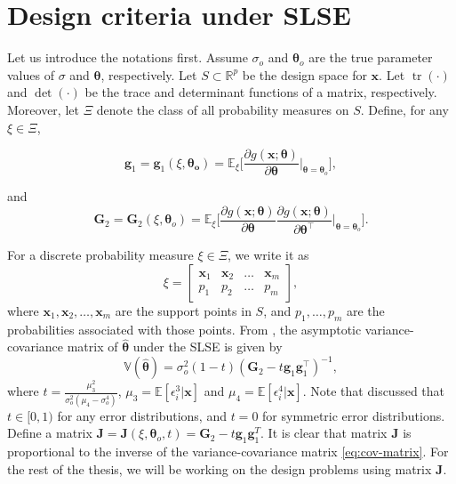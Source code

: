\documentclass[
]{book}
\theoremstyle{definition}
\theoremstyle{definition}
\theoremstyle{definition}
\theoremstyle{definition}
\theoremstyle{remark}
\begin{document}
\section{Design criteria under SLSE}\label{design-criteria-under-slse}

Let us introduce the notations first. Assume \(\sigma_o\) and \(\boldsymbol{\theta}_o\) are the true parameter values of \(\sigma\) and \(\boldsymbol{\theta}\), respectively. Let \(S \subset \mathbb{R}^p\) be the design space for \(\boldsymbol{x}\). Let \(\operatorname{tr}(\cdot)\) and \(\det(\cdot)\) be the trace and determinant functions of a matrix, respectively. Moreover, let \(\Xi\) denote the class of all probability measures on \(S\). Define, for any \(\xi\in \Xi\),

\begin{equation*}
\boldsymbol{g}_1=\boldsymbol{g}_1(\xi,\boldsymbol{\theta_o})=\mathbb{E}_{\xi}\bigg[ \frac{\partial g(\boldsymbol{x};\boldsymbol{\theta})}{\partial \boldsymbol{\theta}}\Big|_{\boldsymbol{\theta}=\boldsymbol{\theta}_o} \bigg],
\end{equation*}

and
\begin{equation*}
\boldsymbol{G}_2=\boldsymbol{G}_2(\xi,\boldsymbol{\theta}_o)=\mathbb{E}_{\xi} \bigg[ \frac{\partial g(\boldsymbol{x};\boldsymbol{\theta})}{\partial \boldsymbol{\theta}}\frac{\partial g(\boldsymbol{x};\boldsymbol{\theta})}{\partial \boldsymbol{\theta}^\top}\Big|_{\boldsymbol{\theta}=\boldsymbol{\theta}_o}\bigg].
\end{equation*}

For a discrete probability measure \(\xi\in \Xi\), we write it as
\[
\xi=\begin{bmatrix}
    \boldsymbol{x}_1&\boldsymbol{x}_2   &\ldots &\boldsymbol{x}_m\\
    p_1     &p_2        &\ldots &p_m
\end{bmatrix},
\]
where \(\boldsymbol{x}_1,\boldsymbol{x}_2,\dots,\boldsymbol{x}_m\) are the support points in \(S\), and \(p_1,\dots,p_m\) are the probabilities associated with those points. From \citet{gao2014new}, the asymptotic variance-covariance matrix of \(\hat{\boldsymbol{\theta}}\) under the SLSE is given by
\begin{equation}
\boldsymbol{\mathbb{V}}({\boldsymbol{\hat{\theta}}})=\sigma^2_o(1-t)(\boldsymbol{G}_2-t\boldsymbol{g}_1\boldsymbol{g}_1^\top)^{-1},
\label{eq:cov-matrix}
\end{equation}
where \(t=\frac{\mu_3^2}{\sigma_o^2(\mu_4-\sigma_o^4)}\), \(\mu_3=\mathbb{E}[\epsilon_i^3|\boldsymbol{x}]\) and \(\mu_4=\mathbb{E}[\epsilon_i^4|\boldsymbol{x}]\). Note that \citet{gao2014new} discussed that \(t \in [0,1)\) for any error distributions, and \(t=0\) for symmetric error distributions. Define a matrix \(\boldsymbol{J}=\boldsymbol{J}(\xi,\boldsymbol{\theta}_o,t) = \boldsymbol{G}_2-t\boldsymbol{g}_1\boldsymbol{g}_1^T\). It is clear that matrix \(\boldsymbol{J}\) is proportional to the inverse of the variance-covariance matrix \eqref{eq:cov-matrix}. For the rest of the thesis, we will be working on the design problems using matrix \(\boldsymbol{J}\).
\end{document}
